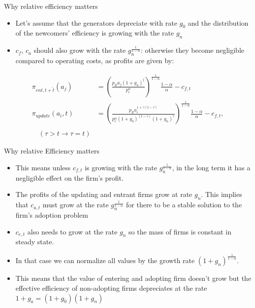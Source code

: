 \documentclass{beamer}
\begin{document}
\begin{frame}{Why relative efficiency matters}\label{rel_eff_why}
\small\begin{itemize}
    \item Let's assume that the generators depreciate with rate $g_0$ and the distribution of the newcomers' efficiency is growing with the rate $g_n$
    \item $c_f$, $c_a$ should also grow with the rate $g_n^\frac{1}{1-\alpha}$: otherwise they become negligible compared to operating costs, as profits are given by:\\
\end{itemize}
\begin{align*}
        \pi_{ent,t+\hat{t}}(a_j) &= \left(\frac{p_E a_j\left(1+g_n\right)^\hat{t}}{p_e^\alpha}\right)^{\frac{1}{1-\alpha}} \frac{1-\alpha}{\alpha} - c_{f,t}\\
        \pi_{update}(a_i,t) &= \left(\frac{p_E a_i^{1+\gamma (t-\tau)}}{p_e^\alpha\left(1+g_0\right)^{(t-\tau)}\left(1+g_n\right)^\tau}\right)^{\frac{1}{1-\alpha}} \frac{1-\alpha}{\alpha}-c_{f,t}, \\\\ \quad (\tau>t \rightarrow \tau = t)
    \end{align*}
\end{frame}
\begin{frame}{Why relative Efficiency matters}
    \begin{itemize}
        \item This means unless $c_{f,t}$ is growing with the rate $g_n^\frac{1}{1-\alpha}$, in the long term it has a negligible effect on the firm's profit. 
        \item The profits of the updating and entrant firms grow at rate $g_n$. This implies that $c_{a,t}$ must grow at the rate $g_n^\frac{1}{1-\alpha}$ for there to be a stable solution to the firm's adoption problem
        \item $c_{e,t}$ also needs to grow at the rate $g_n$ so the mass of firms is constant in steady state.
        \item In that case we can normalize all values by the growth rate $(1+g_n)^\frac{1}{1-\alpha}$. 
        \item This means that the value of entering and adopting firm doesn't grow but the effective efficiency of non-adopting firms depreciates at the rate $1+g_a = (1+g_0)(1+g_n)$
    \end{itemize}
    \hyperlink{gen_problem}{}
\end{frame}
\end{document}
